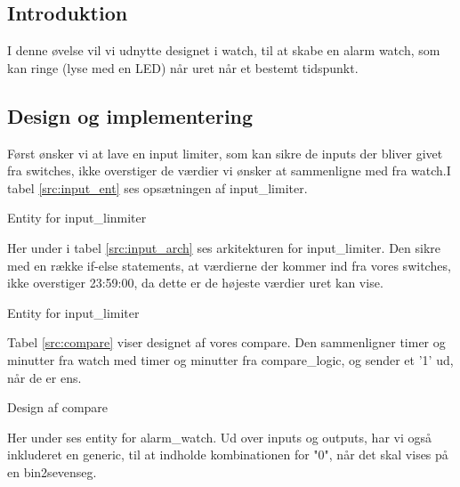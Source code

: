 \documentclass[../journal.tex]{subfiles}
\begin{document}
\subsection{Introduktion}

I denne øvelse vil vi udnytte designet i watch, til at skabe en alarm watch, som kan ringe (lyse med en LED) når uret når et bestemt tidspunkt.

\subsection{Design og implementering}

Først ønsker vi at lave en input limiter, som kan sikre de inputs der bliver givet fra switches, ikke overstiger de værdier vi ønsker at sammenligne med fra watch.I tabel \ref{src:input_ent} ses opsætningen af input\_limiter.
\begin{table}[H]
    \centering
      \framebox{
        \rule{8pt}{0pt}
          
  }
  \caption{Entity for input\_linmiter}	
  \label{src:input_ent}
\end{table}

Her under i tabel \ref{src:input_arch} ses arkitekturen for input\_limiter. Den sikre med en række if-else statements, at værdierne der kommer ind fra vores switches, ikke overstiger 23:59:00, da dette er de højeste værdier uret kan vise.

\begin{table}[H]
    \centering
      \framebox{
        \rule{8pt}{0pt}
          
  }
  \caption{Entity for input\_limiter}	
  \label{src:input_arch}
\end{table}

Tabel \ref{src:compare} viser designet af vores compare. Den sammenligner timer og minutter fra watch med timer og minutter fra compare\_logic, og sender et '1' ud, når de er ens.

\begin{table}[H]
    \centering
      \framebox{
        \rule{8pt}{0pt}
          
  }
  \caption{Design af compare}	
  \label{src:compare}
\end{table}

Her under ses entity for alarm\_watch. Ud over inputs og outputs, har vi også inkluderet en generic, til at indholde kombinationen for "0", når det skal vises på en bin2sevenseg.
\end{document}
